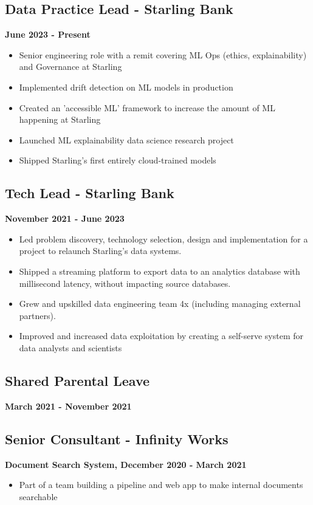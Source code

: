 \documentclass[a4paper,10pt]{article}
\begin{document}
\subsection*{Data Practice Lead - Starling Bank}
\textbf{June 2023 - Present}
\begin{itemize}
      \item Senior engineering role with a remit covering ML Ops
            (ethics,
            explainability) and Governance at Starling
      \item Implemented drift detection on ML models in production
      \item Created an 'accessible ML' framework to increase the amount of ML
            happening at Starling
      \item Launched ML explainability data science research project
      \item Shipped Starling's first entirely cloud-trained models
\end{itemize}

\subsection*{Tech Lead - Starling Bank}
\textbf{November 2021 - June 2023}
\begin{itemize}
      \item Led problem discovery, technology selection, design and
            implementation for a project to relaunch Starling's data systems.
      \item Shipped a streaming platform to export data to an analytics
            database
            with millisecond latency, without impacting source databases.
      \item Grew and upskilled data engineering team 4x (including managing
            external partners).
      \item Improved and increased data exploitation by creating a self-serve
            system for data analysts and scientists
\end{itemize}

\subsection*{Shared Parental Leave}
\textbf{March 2021 - November 2021}

\subsection*{Senior Consultant - Infinity Works}
\textbf{Document Search System, December 2020 - March 2021}
\begin{itemize}
      \item Part of a team building a pipeline and web app to make internal
            documents searchable
\end{itemize}
\end{document}
